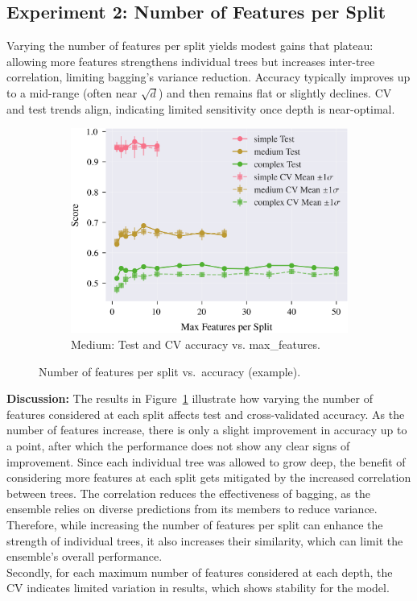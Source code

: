 \documentclass[conference]{IEEEtran}
\begin{document}
\subsection{Experiment 2: Number of Features per Split}
\label{sec:results-exp2}
Varying the number of features per split yields modest gains that plateau: allowing more features strengthens individual trees but increases inter-tree correlation, limiting bagging’s variance reduction. Accuracy typically improves up to a mid-range (often near $\sqrt{d}$) and then remains flat or slightly declines. CV and test trends align, indicating limited sensitivity once depth is near-optimal.

\begin{figure}[H]
  \centering
  \begin{subfigure}[b]{\columnwidth}
    \centering
    \includegraphics[width=\linewidth]{images/all_datasets_accuracy_vs_features.png}
    \caption{Medium: Test and CV accuracy vs. max\_features.}
    \label{fig:exp2-medium-acc}
  \end{subfigure}
  \caption{Number of features per split vs.\ accuracy (example).}
  \label{fig:exp2-accuracy-features}
\end{figure}


\textbf{Discussion:}
The results in Figure~\ref{fig:exp2-medium-acc} illustrate how varying the number of features considered at each split affects test and cross-validated 
  accuracy. As the number of features increase, there is only a slight improvement in accuracy up to a point, after which the performance does not show any clear signs 
  of improvement. Since each individual tree was allowed to grow deep, the benefit of considering more features at each split gets mitigated by the increased correlation 
  between trees. The correlation reduces the effectiveness of bagging, as the ensemble relies on diverse predictions from its members to reduce variance. Therefore, while increasing the number of features per split can enhance the strength of individual trees, it also increases their similarity, which can limit the ensemble's overall performance. \\
  Secondly, for each maximum number of features considered at each depth, the CV indicates limited variation in results, which 
  shows stability for the model. 
\end{document}

